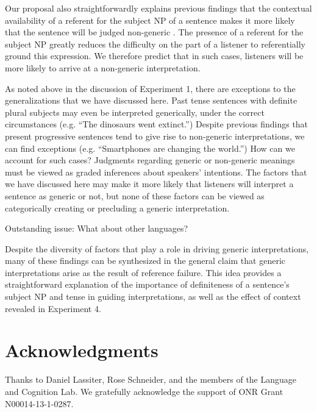 \documentclass[10pt,letterpaper]{article}
\begin{document}
Our proposal also straightforwardly explains previous findings that the contextual availability of a referent for the subject NP of a sentence makes it more likely that the sentence will be judged non-generic \cite{Gelman:2003}. The presence of a referent for the subject NP greatly reduces the difficulty on the part of a listener to referentially ground this expression. We therefore predict that in such cases, listeners will be more likely to arrive at a non-generic interpretation.

As noted above in the discussion of Experiment 1, there are exceptions to the generalizations that we have discussed here. Past tense sentences with definite plural subjects may even be interpreted generically, under the correct circumstances (e.g. ``The dinosaurs went extinct.'') Despite previous findings that present progressive sentences tend to give rise to non-generic interpretations, we can find exceptions (e.g. ``Smartphones are changing the world.'') How can we account for such cases? Judgments regarding generic or non-generic meanings must be viewed as graded inferences about speakers' intentions. The factors that we have discussed here may make it more likely that listeners will interpret a sentence as generic or not, but none of these factors can be viewed as categorically creating or precluding a generic interpretation.

Outstanding issue: What about other languages?

Despite the diversity of factors that play a role in driving generic interpretations, many of these findings can be synthesized in the general claim that generic interpretations arise as the result of reference failure. This idea provides a straightforward explanation of the importance of definiteness of a sentence's subject NP and tense in guiding interpretations, as well as the effect of context revealed in Experiment 4.   

\section{Acknowledgments}

Thanks to Daniel Lassiter, Rose Schneider, and the members of the Language and Cognition Lab. We gratefully acknowledge the support of ONR Grant N00014-13-1-0287.



\setlength{\bibleftmargin}{.125in}
\setlength{\bibindent}{-\bibleftmargin}


\end{document}
